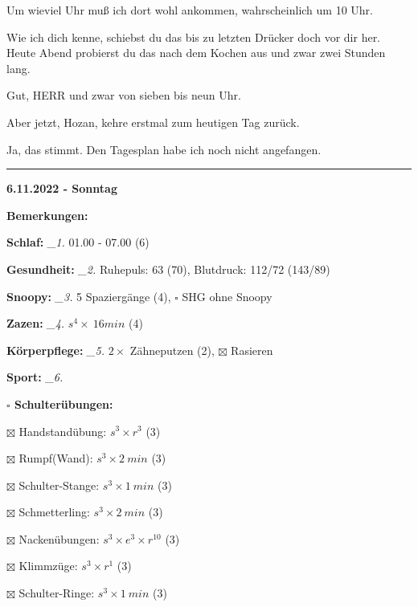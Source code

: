 \documentclass[10pt,a4paper]{article}
\newcommand\prop[1] {{\color {alizarin} {\bf #1}}}             %
\newcommand\rele[1] {{\color {english} \bf {#1}}}              %
\newcommand\mand[1] {{\color {burntorange} {\bf #1}}}          %
\newcommand\ddivide {\vskip -9pt \hrule \vskip 6pt}
\newcommand\topspace{\vskip -15pt \hskip 20pt}
\newcommand\n[1] { {\sl #1.} \hskip 5pt }
\begin{document}
\begin{mdframed}[style=daystyle]
  \vskip 2pt
  Um wieviel Uhr muß ich dort wohl ankommen, wahrscheinlich um 10 Uhr.

  \vskip 2pt
  Wie ich dich kenne, schiebst du das bis zu letzten Drücker doch vor dir her.
  Heute Abend probierst du das nach dem Kochen aus und zwar zwei Stunden lang.

  \vskip 2pt
  Gut, HERR und zwar von sieben bis neun Uhr.

  \vskip 2pt
  Aber jetzt, Hozan, kehre erstmal zum heutigen Tag zurück.

  \vskip 2pt
  Ja, das stimmt. Den Tagesplan habe ich noch nicht angefangen.

\end{mdframed}


\ddivide
{\rele {6.11.2022 - Sonntag}}

\begin{mdframed}[style=daystyle]
  \begin{labeling}{{\mand {Bemerkungen:}}}
    \setlength\itemsep{-3pt}
  \item[{\mand {Schlaf:}}]        \n{\_1} 01.00 - 07.00 (6)
  \item[{\mand {Gesundheit:}}]    \n{\_2} Ruhepuls: 63 (70), Blutdruck: 112/72 (143/89)
  \item[{\mand {Snoopy:}}]        \n{\_3} 5 Spaziergänge (4), $\square$ SHG ohne Snoopy
  \item[{\mand {Zazen:}}]         \n{\_4} $s^4 \times\ 16 min$ (4)
  \item[{\mand {Körperpflege:}}]  \n{\_5} $2 \times$ Zähneputzen (2), $\boxtimes$ Rasieren
  \item[{\mand {Sport:}}]         \n{\_6}
    \topspace
    \begin{minipage}{0.75\textwidth}  
      \begin{labeling}{\prop {$\square$ {Schulterübungen:}}} 
        \setlength\itemsep{-3pt}
      \item[$\boxtimes$ Handstandübung:]  $s^3 \times r^{3}$ (3)
      \item[$\boxtimes$ Rumpf(Wand):]     $s^3 \times 2\ min$ (3)
      \item[$\boxtimes$ Schulter-Stange:] $s^3 \times 1\ min$ (3)
      \item[$\boxtimes$ Schmetterling:]   $s^3 \times 2\ min$ (3)
      \item[$\boxtimes$ Nackenübungen:]   $s^3 \times e^3 \times r^{10}$ (3)
      \item[$\boxtimes$ Klimmzüge:]       $s^3 \times r^1$ (3)
      \item[$\boxtimes$ Schulter-Ringe:]  $s^3 \times 1\ min$ (3)

\end{labeling}
\end{minipage}
\end{labeling}
\end{mdframed}
\end{document}
